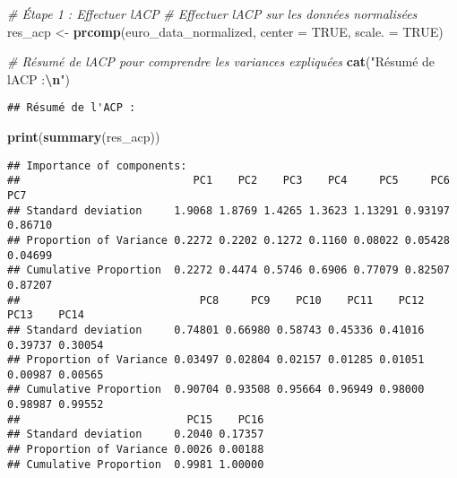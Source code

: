 \documentclass[
]{article}
\newenvironment{Shaded}{\begin{snugshade}}{\end{snugshade}}
\newcommand{\AttributeTok}[1]{\textcolor[rgb]{0.13,0.29,0.53}{#1}}
\newcommand{\CommentTok}[1]{\textcolor[rgb]{0.56,0.35,0.01}{\textit{#1}}}
\newcommand{\ConstantTok}[1]{\textcolor[rgb]{0.56,0.35,0.01}{#1}}
\newcommand{\FunctionTok}[1]{\textcolor[rgb]{0.13,0.29,0.53}{\textbf{#1}}}
\newcommand{\NormalTok}[1]{#1}
\newcommand{\OtherTok}[1]{\textcolor[rgb]{0.56,0.35,0.01}{#1}}
\newcommand{\SpecialCharTok}[1]{\textcolor[rgb]{0.81,0.36,0.00}{\textbf{#1}}}
\newcommand{\StringTok}[1]{\textcolor[rgb]{0.31,0.60,0.02}{#1}}
\begin{document}
\begin{Shaded}
\begin{Highlighting}[]
\CommentTok{\# Étape 1 : Effectuer l\textquotesingle{}ACP}
\CommentTok{\# Effectuer l\textquotesingle{}ACP sur les données normalisées}
\NormalTok{res\_acp }\OtherTok{\textless{}{-}} \FunctionTok{prcomp}\NormalTok{(euro\_data\_normalized, }\AttributeTok{center =} \ConstantTok{TRUE}\NormalTok{, }\AttributeTok{scale. =} \ConstantTok{TRUE}\NormalTok{)}

\CommentTok{\# Résumé de l\textquotesingle{}ACP pour comprendre les variances expliquées}
\FunctionTok{cat}\NormalTok{(}\StringTok{"Résumé de l\textquotesingle{}ACP :}\SpecialCharTok{\textbackslash{}n}\StringTok{"}\NormalTok{)}
\end{Highlighting}
\end{Shaded}

\begin{verbatim}
## Résumé de l'ACP :
\end{verbatim}

\begin{Shaded}
\begin{Highlighting}[]
\FunctionTok{print}\NormalTok{(}\FunctionTok{summary}\NormalTok{(res\_acp))}
\end{Highlighting}
\end{Shaded}

\begin{verbatim}
## Importance of components:
##                           PC1    PC2    PC3    PC4     PC5     PC6     PC7
## Standard deviation     1.9068 1.8769 1.4265 1.3623 1.13291 0.93197 0.86710
## Proportion of Variance 0.2272 0.2202 0.1272 0.1160 0.08022 0.05428 0.04699
## Cumulative Proportion  0.2272 0.4474 0.5746 0.6906 0.77079 0.82507 0.87207
##                            PC8     PC9    PC10    PC11    PC12    PC13    PC14
## Standard deviation     0.74801 0.66980 0.58743 0.45336 0.41016 0.39737 0.30054
## Proportion of Variance 0.03497 0.02804 0.02157 0.01285 0.01051 0.00987 0.00565
## Cumulative Proportion  0.90704 0.93508 0.95664 0.96949 0.98000 0.98987 0.99552
##                          PC15    PC16
## Standard deviation     0.2040 0.17357
## Proportion of Variance 0.0026 0.00188
## Cumulative Proportion  0.9981 1.00000
\end{verbatim}
\end{document}
